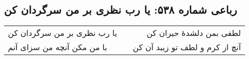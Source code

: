 \begin{center}
\section*{رباعی شماره ۵۳۸: یا رب نظری بر من سرگردان کن}
\label{sec:sh538}
\begin{longtable}{l p{0.5cm} r}
یا رب نظری بر من سرگردان کن
&&
لطفی بمن دلشدهٔ حیران کن
\\
با من مکن آنچه من سزای آنم
&&
آنچ از کرم و لطف تو زیبد آن کن
\\
\end{longtable}
\end{center}

